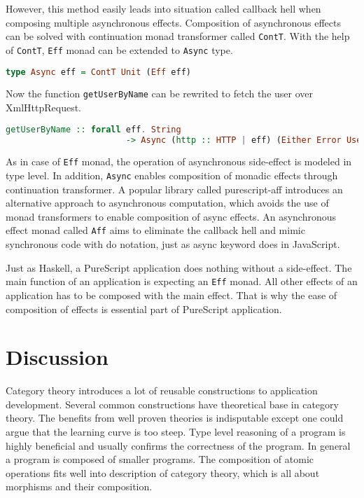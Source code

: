 \documentclass[article]{aaltoseries}
\begin{document}
      However, this method easily leads into situation called callback hell when
      composing multiple asynchronous effects. Composition of asynchronous
      effects can be solved with continuation monad transformer called
      \lstinline|ContT|. With the help of \lstinline|ContT|, \lstinline|Eff|
      monad can be extended to \lstinline|Async| type.
 
      \begin{lstlisting}[language=Haskell]
        type Async eff = ContT Unit (Eff eff)
      \end{lstlisting}

      Now the function \lstinline|getUserByName| can be rewrited to fetch the
      user over XmlHttpRequest.

      \begin{lstlisting}[language=Haskell]
        getUserByName :: forall eff. String 
                        -> Async (http :: HTTP | eff) (Either Error User)
      \end{lstlisting}
 
      As in case of \lstinline|Eff| monad, the operation of asynchronous
      side-effect is modeled in type level. In addition, \lstinline|Async|
      enables composition of monadic effects through continuation transformer. A
      popular library called purescript-aff introduces an alternative approach
      to asynchronous computation, which avoids the use of monad transformers to
      enable composition of async effects. An asynchronous effect monad called
      \lstinline|Aff| aims to eliminate the callback hell and mimic synchronous
      code with do notation, just as async keyword does in JavaScript.
 
      Just as Haskell, a PureScript application does nothing without a
      side-effect. The main function of an application is expecting an
      \lstinline|Eff| monad. All other effects of an application has to be
      composed with the main effect. That is why the ease of composition of
      effects is essential part of PureScript application.


\section{Discussion}

Category theory introduces a lot of reusable constructions to application
development. Several common constructions have theoretical base in category
theory. The benefits from well proven theories is indisputable except one could
argue that the learning curve is too steep. Type level reasoning of a program is
highly beneficial and usually confirms the correctness of the program. In
general a program is composed of smaller programs. The composition of atomic
operations fits well into description of category theory, which is all about
morphisms and their composition.
 
\end{document}
